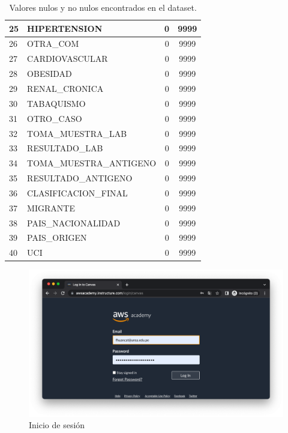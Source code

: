 \begin{table}[h]
{\begin{tabular}{|l|l|c|c|}
25 & HIPERTENSION            & 0 & 9999 \\ \hline
26 & OTRA\_COM               & 0 & 9999 \\ \hline
27 & CARDIOVASCULAR          & 0 & 9999 \\ \hline
28 & OBESIDAD                & 0 & 9999 \\ \hline
29 & RENAL\_CRONICA          & 0 & 9999 \\ \hline
30 & TABAQUISMO              & 0 & 9999 \\ \hline
31 & OTRO\_CASO              & 0 & 9999 \\ \hline
32 & TOMA\_MUESTRA\_LAB      & 0 & 9999 \\ \hline
33 & RESULTADO\_LAB          & 0 & 9999 \\ \hline
34 & TOMA\_MUESTRA\_ANTIGENO & 0 & 9999 \\ \hline
35 & RESULTADO\_ANTIGENO     & 0 & 9999 \\ \hline
36 & CLASIFICACION\_FINAL    & 0 & 9999 \\ \hline
37 & MIGRANTE                & 0 & 9999 \\ \hline
38 & PAIS\_NACIONALIDAD      & 0 & 9999 \\ \hline
39 & PAIS\_ORIGEN            & 0 & 9999 \\ \hline
40 & UCI                     & 0 & 9999 \\ \hline
\end{tabular}
}
\caption{Valores nulos y no nulos encontrados en el dataset.}
\label{tabla:autores}
\end{table}




\clearpage
\begin{figure}[h]
	\centering
	\includegraphics[scale=.3] {img/00-login}
	\caption{Inicio de sesión}
	\label{fig:0}	
\end{figure}

